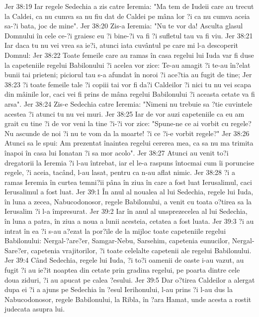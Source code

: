 Jer 38:19  Iar regele Sedechia a zis catre Ieremia: "Ma tem de Iudeii care au trecut la Caldei, ca nu cumva sa nu fiu dat de Caldei pe mâna lor ?i ca nu cumva aceia sa-?i bata, joc de mine".
Jer 38:20  Zis-a Ieremia: "Nu te vor da! Asculta glasul Domnului în cele ce-?i graiesc eu ?i bine-?i va fi ?i sufletul tau va fi viu.
Jer 38:21  Iar daca tu nu vei vrea sa ie?i, atunci iata cuvântul pe care mi l-a descoperit Domnul:
Jer 38:22  Toate femeile care au ramas în casa regelui lui Iuda var fi duse la capeteniile regelui Babilonului ?i acelea vor zice: Te-au amagit ?i te-au în?elat bunii tai prieteni; piciorul tau s-a afundat în noroi ?i ace?tia au fugit de tine;
Jer 38:23  ?i toate femeile tale ?i copiii tai vor fi da?i Caldeilor ?i nici tu nu vei scapa din mâinile lor, caci vei fi prins de mâna regelui Babilonului ?i aceasta cetate va fi arsa".
Jer 38:24  Zis-e Sedechia catre Ieremia: "Nimeni nu trebuie sa ?tie cuvintele acestea ?i atunci tu nu vei muri.
Jer 38:25  Iar de vor auzi capeteniile ca eu am grait cu tine ?i de vor veni la tine ?i-?i vor zice: "Spune-ne ce ai vorbit cu regele? Nu ascunde de noi ?i nu te vom da la moarte! ?i ce ?i-e vorbit regele?"
Jer 38:26  Atunci sa le spui: Am prezentat înaintea regelui cererea mea, ca sa nu ma trimita înapoi în casa lui Ionatan ?i sa mor acolo".
Jer 38:27  Atunci au venit to?i dregatorii la Ieremia ?i l-au întrebat, iar el le-a raspuns întocmai cum îi poruncise regele, ?i aceia, tacând, l-au lasat, pentru ca n-au aflat nimic.
Jer 38:28  ?i a ramas Ieremia în curtea temni?ii pâna în ziua în care a fost luat Ierusalimul, caci Ierusalimul a fost luat.
Jer 39:1  În anul al noualea al lui Sedechia, regele lui Iuda, în luna a zecea, Nabucodonosor, regele Babilonului, a venit cu toata o?tirea sa la Ierusalim ?i l-a împresurat.
Jer 39:2  Iar în anul al unsprezecelea al lui Sedechia, în luna a patra, în ziua a noua a lunii acesteia, cetatea a fost luata.
Jer 39:3  ?i au intrat în ea ?i s-au a?ezat la por?ile de la mijloc toate capeteniile regelui Babilonului: Nergal-?are?er, Samgar-Nebu, Sarsehim, capetenia eunucilor, Nergal-Sare?er, capetenia vrajitorilor, ?i toate celelalte capetenii ale regelui Babilonului.
Jer 39:4  Când Sedechia, regele lui Iuda, ?i to?i oamenii de oaste i-au vazut, au fugit ?i au ie?it noaptea din cetate prin gradina regelui, pe poarta dintre cele doua ziduri, ?i au apucat pe calea ?esului.
Jer 39:5  Dar o?tirea Caldeilor a alergat dupa ei ?i a ajuns pe Sedechia în ?esul Ierihonului, l-au prins ?i l-au dus la Nabucodonosor, regele Babilonului, la Ribla, în ?ara Hamat, unde acesta a rostit judecata asupra lui.

